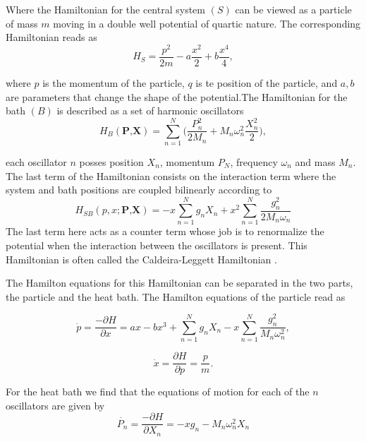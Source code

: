 Where the Hamiltonian for the central system $(S)$ can be viewed as a particle of mass $m$ moving in a double well potential of quartic nature. The corresponding Hamiltonian reads as
\begin{equation}
H_{S}=\frac{p^2}{2m}-a\frac{x^2}{2}+b\frac{x^4}{4},
\label{eq:particle_hamiltonian}
\end{equation}

where $p$ is the momentum of the particle, $q$ is te position of the particle, and $a,b$ are parameters that change the shape of the potential.The Hamiltonian for the bath $(B)$ is described as a set of harmonic oscillators
\begin{equation}
H_B(\textbf{P,X})= \sum_{n=1}^N \Big(\frac{P_n^2}{2M_n}+M_n \omega_n^2\frac{X_n^2}{2} \Big),
\label{eq:bath_hamiltonian}
\end{equation}

each oscillator $n$ posses position $X_n$, momentum $P_N$, frequency $\omega_n$ and mass $M_n$. The last term of the Hamiltonian consists on the interaction term where the system and bath positions are coupled bilinearly according to
\begin{equation}
H_{SB}(p,x;\textbf{P,X})=-x\sum_{n=1}^N g_n X_n+x^2 \sum_{n=1}^N\frac{g_n^2}{2M_n \omega_n}
\label{eq:interaction_hamiltonian}
\end{equation}
The last term here acts as a counter term whose job is to renormalize the potential when the interaction between the oscillators is present. This Hamiltonian is often called the Caldeira-Leggett Hamiltonian \cite{caldeira1981influence}.\par 

The Hamilton equations for this Hamiltonian can be separated in the two parts, the particle and the heat bath. The Hamilton equations of the particle read as

\begin{equation}
\dot{p}=\frac{-\partial H}{\partial x}=ax-bx^3+\sum_{n=1}^N g_n X_n-x\sum_{n=1}^N \frac{g_n^2}{M_n \omega_n^2},
\end{equation}

\begin{equation}
\dot{x}=\frac{\partial H}{\partial p}=\frac{p}{m}.
\end{equation}

For the heat bath we find that the equations of motion for each of the $n$ oscillators are given by
\begin{equation}
\dot{P_n}=\frac{-\partial H}{\partial X_n}=-xg_n-M_n \omega _n ^2 X_n
\end{equation}

